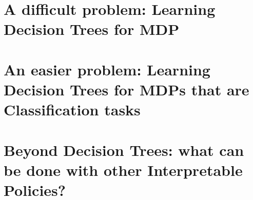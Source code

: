 \documentclass[12pt,space=onehalf,version=final]{yathesis}
\begin{document}
\part{A difficult problem: Learning Decision Trees for MDP}
% 

%

%

%
%
\part{An easier problem: Learning Decision Trees for MDPs that are Classification tasks}
%

%

%



\part{Beyond Decision Trees: what can be done with other Interpretable Policies?}
%
%
%
%

%
\printbibliography
%
\appendix
%

%
\backmatter
%
%
%
\tableofcontents
%
%
\end{document}
